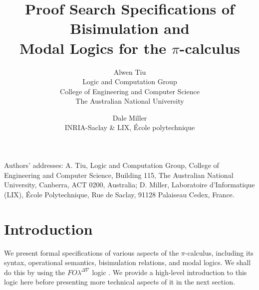 \documentclass{acmtrans2m}
\title{Proof Search Specifications of Bisimulation and\\
       Modal Logics for the $\pi$-calculus}
\author{Alwen Tiu \\ Logic and Computation Group\\ 
College of Engineering and Computer Science\\
The Australian National University
\and 
Dale Miller\\ INRIA-Saclay \& LIX, \'Ecole polytechnique}
\newcommand{\FOL   }{FO\lambda}
\newcommand{\FOLDNb}{\FOL^{\Delta\nabla}}
\begin{document}
\begin{bottomstuff}
Authors' addresses: A. Tiu, Logic and Computation Group, College of Engineering
and Computer Science, Building 115, The Australian National University,
Canberra, ACT 0200, Australia; D. Miller, Laboratoire d'Informatique
(LIX), \'Ecole Polytechnique, Rue de Saclay, 91128 Palaiseau Cedex,
France. 
\end{bottomstuff}
\maketitle

\section{Introduction}
\label{sec:intro}

We present formal specifications of various aspects of the
$\pi$-calculus, including its syntax, operational semantics,
bisimulation relations, and modal logics.  We shall do this by using
the $\FOLDNb$ logic \cite{miller05tocl}.  We provide a high-level
introduction to this logic here before presenting more technical
aspects of it in the next section.
\end{document}

